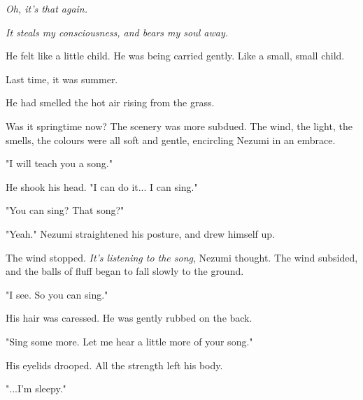 \emph{Oh, it's that again.}

\emph{It steals my consciousness, and bears my soul away.}

He felt like a little child. He was being carried gently. Like a small,
small child.

Last time, it was summer.

He had smelled the hot air rising from the grass.

Was it springtime now? The scenery was more subdued. The wind, the
light, the smells, the colours were all soft and gentle, encircling
Nezumi in an embrace.

"I will teach you a song."

He shook his head. "I can do it... I can sing."

"You can sing? That song?"

"Yeah." Nezumi straightened his posture, and drew himself up.


The wind stopped. \emph{It's listening to the song}, Nezumi thought. The wind
subsided, and the balls of fluff began to fall slowly to the ground.

"I see. So you can sing."

His hair was caressed. He was gently rubbed on the back.

"Sing some more. Let me hear a little more of your song."


His eyelids drooped. All the strength left his body.

"...I'm sleepy."

